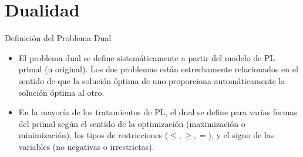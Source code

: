 
\section{Dualidad}
\label{sec:duality}



\begin{frame}{Definición del Problema Dual}
  \begin{itemize}\justifying \parskip3mm


\item  El problema dual se define sistemáticamente a partir del modelo de PL primal (u original). Los dos problemas están estrechamente relacionados en el sentido de que la solución óptima de uno proporciona automáticamente la solución óptima al otro.
\item   En la mayoría de los tratamientos de PL, el dual se define para varias formas del primal según el sentido de la optimización (maximización o minimización), los tipos de restricciones ($\leq,  \geq, =$), y el signo de las variables (no negativas o irrestrictas).
  \end{itemize}
\end{frame}

